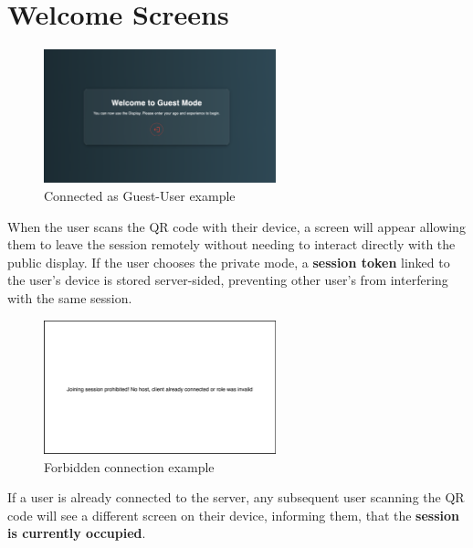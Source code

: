 \section{Welcome Screens}

\begin{figure}[H]
    \centering
    \includegraphics[width=0.6\textwidth]{images/WelcomeScreen.png}
    \caption{Connected as Guest-User example}
\end{figure}
When the user scans the QR code with their device, a screen will appear allowing them to leave the 
session remotely without needing to interact directly with the public display. 
If the user chooses the private mode, a \textbf{session token} linked to the user's device is stored server-sided, preventing other 
user's from interfering with the same session.

\begin{figure}[H]
    \centering
    \includegraphics[width=0.6\textwidth]{images/WelcomeScreenInvalid.png}
    \caption{Forbidden connection example}
\end{figure}
If a user is already connected to the server, any subsequent user scanning the QR code will see 
a different screen on their device, informing them, that the \textbf{session is currently occupied}.
